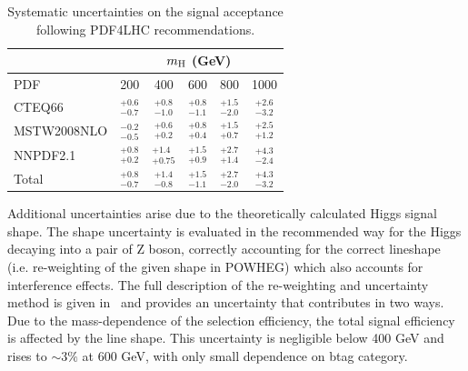 \def\arraystretch{1.7}
\begin{table}[hb]
\caption{Systematic uncertainties on the signal acceptance following PDF4LHC recommendations.}
\label{tab:pdf}
\begin{center}
\small
\begin{tabular}{|l|ccccc|}
\cline{2-6}
\multicolumn{1}{c|}{} & \multicolumn{5}{c|}{$m_{\mathrm{H}}$ (GeV)} \\ \hline
PDF         & 200               & 400               & 600               & 800               & 1000             \\ \hline
CTEQ66      & $^{+0.6}_{-0.7}$  & $^{+0.8}_{-1.0}$  & $^{+0.8}_{-1.1}$  & $^{+1.5}_{-2.0}$  & $^{+2.6}_{-3.2}$ \\
MSTW2008NLO & $^{-0.2}_{-0.5}$  & $^{+0.6}_{+0.2}$  & $^{+0.8}_{+0.4}$  & $^{+1.5}_{+0.7}$  & $^{+2.5}_{+1.2}$ \\
NNPDF2.1    & $^{+0.8}_{+0.2}$  & $^{+1.4}_{+0.75}$ & $^{+1.5}_{+0.9}$  & $^{+2.7}_{+1.4}$  & $^{+4.3}_{-2.4}$ \\ \hline
Total       & $^{+0.8}_{-0.7}$  & $^{+1.4}_{-0.8}$  & $^{+1.5}_{-1.1}$  & $^{+2.7}_{-2.0}$  & $^{+4.3}_{-3.2}$ \\ \hline
\end{tabular}
\end{center}
\end{table}
\def\arraystretch{1}

Additional uncertainties arise due to the theoretically calculated Higgs signal shape. The shape uncertainty is evaluated in the recommended way for the Higgs decaying into a pair of Z boson, correctly accounting for the correct lineshape (i.e. re-weighting of the given shape in POWHEG) which also accounts for interference effects. The full description of the re-weighting and uncertainty method is given in~\cite{4l} and provides an uncertainty that contributes in two ways. Due to the mass-dependence of the selection efficiency, the total signal efficiency is affected by the line shape. 
This uncertainty is negligible below 400 GeV{} and rises to $\sim3\%$ at 600 GeV{}, with only small dependence on btag category.


